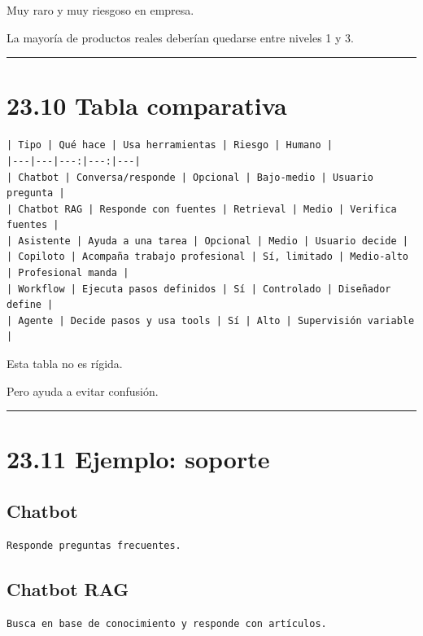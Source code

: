Muy raro y muy riesgoso en empresa.

La mayoría de productos reales deberían quedarse entre niveles 1 y 3.

\begin{center}\rule{0.5\linewidth}{0.5pt}\end{center}

\section{23.10 Tabla comparativa}\label{tabla-comparativa}

\begin{lstlisting}
| Tipo | Qué hace | Usa herramientas | Riesgo | Humano |
|---|---|---:|---:|---|
| Chatbot | Conversa/responde | Opcional | Bajo-medio | Usuario pregunta |
| Chatbot RAG | Responde con fuentes | Retrieval | Medio | Verifica fuentes |
| Asistente | Ayuda a una tarea | Opcional | Medio | Usuario decide |
| Copiloto | Acompaña trabajo profesional | Sí, limitado | Medio-alto | Profesional manda |
| Workflow | Ejecuta pasos definidos | Sí | Controlado | Diseñador define |
| Agente | Decide pasos y usa tools | Sí | Alto | Supervisión variable |
\end{lstlisting}

Esta tabla no es rígida.

Pero ayuda a evitar confusión.

\begin{center}\rule{0.5\linewidth}{0.5pt}\end{center}

\section{23.11 Ejemplo: soporte}\label{ejemplo-soporte}

\subsection{Chatbot}\label{chatbot-2}

\begin{lstlisting}
Responde preguntas frecuentes.
\end{lstlisting}

\subsection{Chatbot RAG}\label{chatbot-rag}

\begin{lstlisting}
Busca en base de conocimiento y responde con artículos.
\end{lstlisting}

